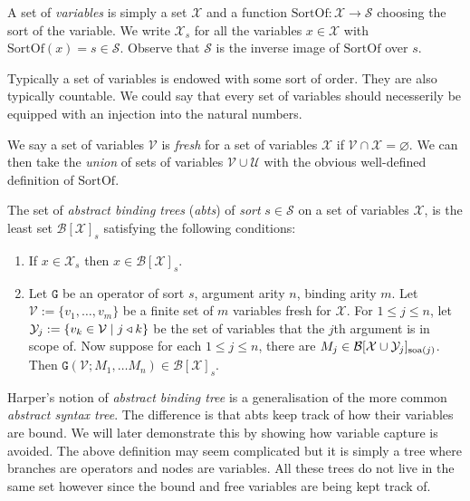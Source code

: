 \begin{defin}\label{variables}
    A set of \emph{variables} is simply a set $\mathcal{X}$ and a function $\mathrm{SortOf} : \mathcal{X} \to \mathcal{S}$ choosing the sort of the variable. We write $\mathcal{X}_s$ for all the variables $x \in \mathcal{X}$ with $\mathrm{SortOf}(x) = s \in \mathcal{S}$. Observe that $\mathcal{S}$ is the inverse image of $\mathrm{SortOf}$ over $s$.
\end{defin}

\begin{remark}\label{var_order}
    Typically a set of variables is endowed with some sort of order. They are also typically countable. We could say that every set of variables should necesserily be equipped with an injection into the natural numbers.
\end{remark}

\begin{defin}
    We say a set of variables $\mathcal{V}$ is \emph{fresh} for a set of variables $\mathcal{X}$ if $\mathcal{V} \cap \mathcal{X} = \varnothing$. We can then take the \emph{union} of sets of variables $\mathcal{V} \cup \mathcal{U}$ with the obvious well-defined definition of $\mathrm{SortOf}$.
\end{defin}

\begin{defin}
    The set of \emph{abstract binding trees} (\emph{abts}) of \emph{sort} $s\in \mathcal{S}$ on a set of variables $\mathcal{X}$, is the least set $\mathcal{B}[\mathcal{X}]_s$ satisfying the following conditions:
    \begin{enumerate}
        \item If $x \in \mathcal{X}_s$ then $x \in \mathcal{B}[\mathcal{X}]_s$.
        \item Let $\mathtt{G}$ be an operator of sort $s$, argument arity $n$, binding arity $m$. Let $\mathcal{V} := \{v_1, \dots , v_m \}$ be a finite set of $m$ variables fresh for $\mathcal{X}$. For $1 \le j \le n$, let $\mathcal{Y}_j := \{ v_k \in \mathcal{V} \mid j \triangleleft k\}$ be the set of variables that the $j$th argument is in scope of. Now suppose for each $1 \le j \le n$, there are $M_j \in \mathcal{B}[\mathcal{X} \cup \mathcal{Y}_j]_{\text{soa}(j)}$. Then $\mathtt{G}(\mathcal{V}; M_1, \dots M_n) \in \mathcal{B}[\mathcal{X}]_s$.
    \end{enumerate}
\end{defin}

\begin{remark}
    Harper's notion of \emph{abstract binding tree} is a generalisation of the more common \emph{abstract syntax tree}. The difference is that abts keep track of how their variables are bound. We will later demonstrate this by showing how variable capture is avoided. The above definition may seem complicated but it is simply a tree where branches are operators and nodes are variables. All these trees do not live in the same set however since the bound and free variables are being kept track of.
\end{remark}

